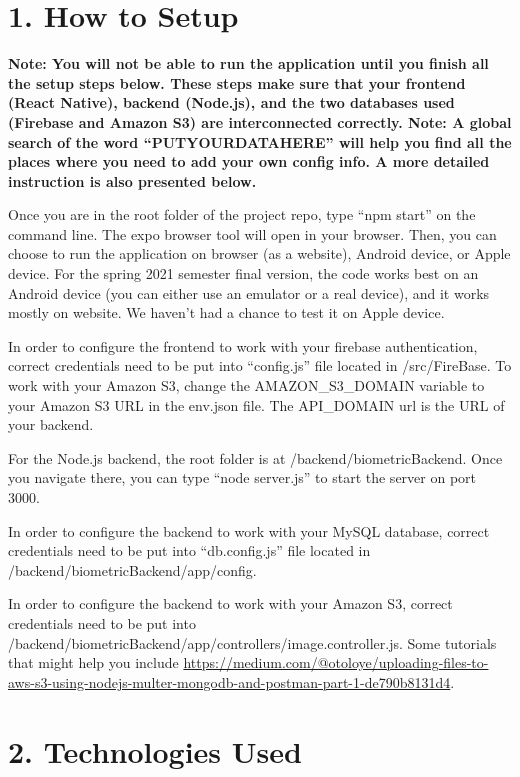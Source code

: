 \documentclass[]{book}
\begin{document}
\section{1. How to Setup}\label{how-to-setup}

\textbf{Note: You will not be able to run the application until you
finish all the setup steps below. These steps make sure that your
frontend (React Native), backend (Node.js), and the two databases used
(Firebase and Amazon S3) are interconnected correctly. Note: A global
search of the word ``PUTYOURDATAHERE'' will help you find all the places
where you need to add your own config info. A more detailed instruction
is also presented below.}

Once you are in the root folder of the project repo, type ``npm start''
on the command line. The expo browser tool will open in your browser.
Then, you can choose to run the application on browser (as a website),
Android device, or Apple device. For the spring 2021 semester final
version, the code works best on an Android device (you can either use an
emulator or a real device), and it works mostly on website. We haven't
had a chance to test it on Apple device.

In order to configure the frontend to work with your firebase
authentication, correct credentials need to be put into ``config.js''
file located in /src/FireBase. To work with your Amazon S3, change the
AMAZON\_S3\_DOMAIN variable to your Amazon S3 URL in the env.json file.
The API\_DOMAIN url is the URL of your backend.

For the Node.js backend, the root folder is at
/backend/biometricBackend. Once you navigate there, you can type ``node
server.js'' to start the server on port 3000.

In order to configure the backend to work with your MySQL database,
correct credentials need to be put into ``db.config.js'' file located in
/backend/biometricBackend/app/config.

In order to configure the backend to work with your Amazon S3, correct
credentials need to be put into
/backend/biometricBackend/app/controllers/image.controller.js. Some
tutorials that might help you include
\url{https://medium.com/@otoloye/uploading-files-to-aws-s3-using-nodejs-multer-mongodb-and-postman-part-1-de790b8131d4}.

\section{2. Technologies Used}\label{technologies-used}
\end{document}
